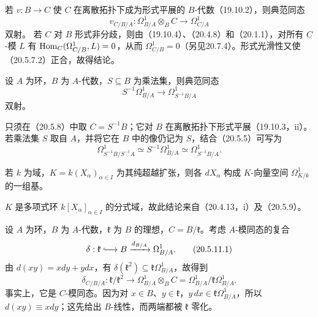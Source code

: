 若 $v:B\to C$ 使 $C$ 在离散拓扑下成为形式平展的 $B$-代数（19.10.2），则典范同态
\[
 v_{C/B/A}:\Omega^1_{B/A}\otimes_B C\longrightarrow\Omega^1_{C/A}
\]
双射。
若 $C$ 对 $B$ 形式非分歧，则由（19.10.4）、（20.4.8）和（20.1.1），对所有 $C$-模 $L$ 有 $\operatorname{Hom}_C(\Omega^1_{C/B},L)=0$，从而 $\Omega^1_{C/B}=0$（另见20.7.4）。形式光滑性又使（20.5.7.2）正合，故得结论。

设 $A$ 为环，$B$ 为 $A$-代数，$S\subseteq B$ 为乘法集，则典范同态
\begin{equation}
 S^{-1}\Omega^1_{B/A}\longrightarrow\Omega^1_{S^{-1}B/A}
 \tag{20.5.9.1}
\end{equation}
双射。

只须在（20.5.8）中取 $C=S^{-1}B$；它对 $B$ 在离散拓扑下形式平展（19.10.3，ii）。若乘法集 $S$ 取自 $A$，并将它在 $B$ 中的像仍记为 $S$，结合（20.5.5）可写为
\begin{equation}
 \Omega^1_{S^{-1}B/S^{-1}A}
 \simeq S^{-1}\Omega^1_{B/A}
 \simeq\Omega^1_{S^{-1}B/A}.
 \tag{20.5.9.2}
\end{equation}

若 $k$ 为域，$K=k(X_\alpha)_{\alpha\in I}$ 为其纯超越扩张，则各 $dX_\alpha$ 构成 $K$-向量空间 $\Omega^1_{K/k}$ 的一组基。

$K$ 是多项式环 $k[X_\alpha]_{\alpha\in I}$ 的分式域，故此结论来自（20.4.13，i）及（20.5.9）。

设 $A$ 为环，$B$ 为 $A$-代数，$\mathfrak k$ 为 $B$ 的理想，$C=B/\mathfrak k$。考虑 $A$-模同态的复合
\begin{equation}
 \delta:\mathfrak k\lhook\joinrel\longrightarrow B
 \xrightarrow{d_{B/A}}\Omega^1_{B/A}.
 \tag{20.5.11.1}
\end{equation}
由 $d(xy)=xdy+ydx$，有 $\delta(\mathfrak k^2)\subseteq\mathfrak k\Omega^1_{B/A}$，故得到
\begin{equation}
 \delta_{C/B/A}:\mathfrak k/\mathfrak k^2
 \longrightarrow\Omega^1_{B/A}\otimes_B C
 =\Omega^1_{B/A}/\mathfrak k\Omega^1_{B/A}.
 \tag{20.5.11.2}
\end{equation}
事实上，它是 $C$-模同态。因为对 $x\in B$、$y\in\mathfrak k$，$y\,dx\in\mathfrak k\Omega^1_{B/A}$，所以 $d(xy)\equiv xdy$；这先给出 $B$-线性，而两端都被 $\mathfrak k$ 零化。

